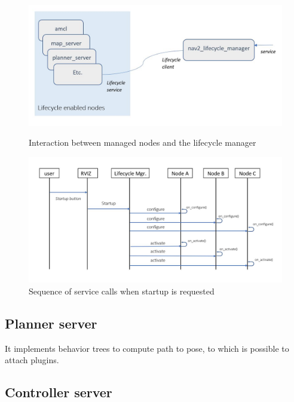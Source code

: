 \begin{figure}[h]
    \centering
    \begin{minipage}[h]{0.45\textwidth}
        \centering
        \includegraphics[width=\textwidth]{images/diagram_lifecycle_manager}
        \caption{Interaction between managed nodes and the lifecycle manager}
    \end{minipage}
    \hfill  
    \begin{minipage}[h]{0.45\textwidth}
        \centering
        \includegraphics[width=\textwidth]{images/uml_lifecycle_manager}
        \caption{Sequence of service calls when startup is requested}
    \end{minipage}
\end{figure}

\subsection{Planner server}

It implements behavior trees to compute path to pose, to which is possible to attach plugins.

\subsection{Controller server}

